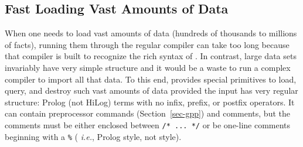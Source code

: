 
\subsection{Fast Loading Vast Amounts of Data}
\label{sec-fastload}

When one needs to load vast amounts of data (hundreds of thousands to
millions of facts), running them through the regular \FLSYSTEM compiler can
take too long because that compiler is built to recognize the rich syntax
of \FLSYSTEM. In contrast, large data sets invariably have very simple
structure and it would be a waste to run a complex compiler to import all
that data. To this end, \FLSYSTEM provides special primitives to load,
query, and destroy such vast amounts of data provided the input has very
regular structure: Prolog (not HiLog)
terms with no infix, prefix, or postfix operators.
It can contain \FLSYSTEM preprocessor commands (Section~\ref{sec-gpp})
and comments, but the comments must be either enclosed between \texttt{/*
  ... */} or be one-line comments beginning with a \texttt{\%} ({\it
  i.e.}, Prolog style, not \FLSYSTEM style).   

